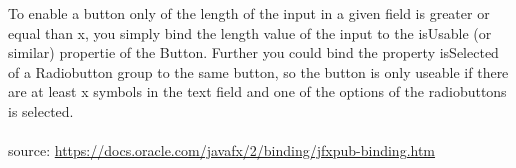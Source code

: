 \documentclass[a4paper, fontsize=12pt]{scrartcl}
\begin{document}
To enable a button only of the length of the input in a given field is greater or equal than x, you simply bind the length value of the input to the isUsable (or similar) propertie of the Button. Further you could bind the property isSelected of a Radiobutton group to the same button, so the button is only useable if there are at least x symbols in the text field and one of the options of the radiobuttons is selected.\\\\
source: \url{https://docs.oracle.com/javafx/2/binding/jfxpub-binding.htm} 
\end{document}

